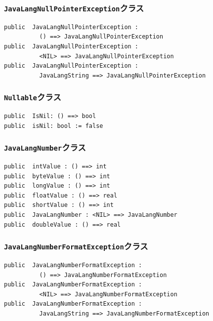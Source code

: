 \documentclass[\pformat,12pt]{jarticle}
\begin{document}
\subsubsection{\texttt{JavaLangNullPointerException}クラス}
\begin{small}
\begin{verbatim}
public  JavaLangNullPointerException : 
          () ==> JavaLangNullPointerException
public  JavaLangNullPointerException : 
          <NIL> ==> JavaLangNullPointerException
public  JavaLangNullPointerException : 
          JavaLangString ==> JavaLangNullPointerException
\end{verbatim}
\end{small}

\subsubsection{\texttt{Nullable}クラス}
\begin{small}
\begin{verbatim}
public  IsNil: () ==> bool
public  isNil: bool := false
\end{verbatim}
\end{small}

\subsubsection{\texttt{JavaLangNumber}クラス}
\begin{small}
\begin{verbatim}
public  intValue : () ==> int
public  byteValue : () ==> int
public  longValue : () ==> int
public  floatValue : () ==> real
public  shortValue : () ==> int
public  JavaLangNumber : <NIL> ==> JavaLangNumber
public  doubleValue : () ==> real
\end{verbatim}
\end{small}

\subsubsection{\texttt{JavaLangNumberFormatException}クラス}
\begin{small}
\begin{verbatim}
public  JavaLangNumberFormatException : 
          () ==> JavaLangNumberFormatException
public  JavaLangNumberFormatException : 
          <NIL> ==> JavaLangNumberFormatException
public  JavaLangNumberFormatException : 
          JavaLangString ==> JavaLangNumberFormatException
\end{verbatim}
\end{small}
\end{document}
